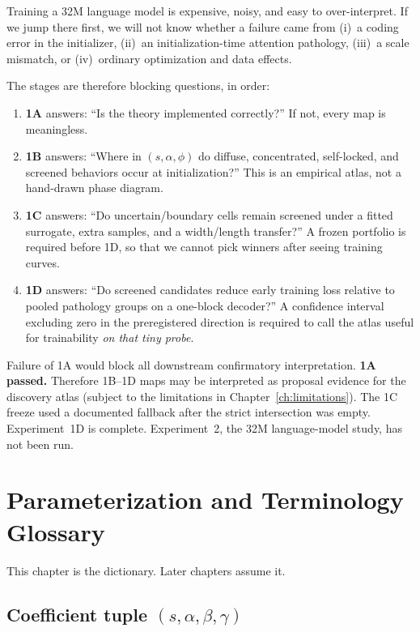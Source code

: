\documentclass[11pt,a4paper]{report}
\begin{document}
Training a 32M language model is expensive, noisy, and easy to over-interpret. If we jump there first, we will not know whether a failure came from (i)~a coding error in the initializer, (ii)~an initialization-time attention pathology, (iii)~a scale mismatch, or (iv)~ordinary optimization and data effects.

The stages are therefore blocking questions, in order:
\begin{enumerate}[leftmargin=*]
  \item \textbf{1A} answers: ``Is the theory implemented correctly?'' If not, every map is meaningless.
  \item \textbf{1B} answers: ``Where in $(s,\alpha,\phi)$ do diffuse, concentrated, self-locked, and screened behaviors occur at initialization?'' This is an empirical atlas, not a hand-drawn phase diagram.
  \item \textbf{1C} answers: ``Do uncertain/boundary cells remain screened under a fitted surrogate, extra samples, and a width/length transfer?'' A frozen portfolio is required before 1D, so that we cannot pick winners after seeing training curves.
  \item \textbf{1D} answers: ``Do screened candidates reduce early training loss relative to pooled pathology groups on a one-block decoder?'' A confidence interval excluding zero in the preregistered direction is required to call the atlas useful for trainability \emph{on that tiny probe}.
\end{enumerate}

Failure of 1A would block all downstream confirmatory interpretation. \textbf{1A passed.} Therefore 1B--1D maps may be interpreted as proposal evidence for the discovery atlas (subject to the limitations in Chapter~\ref{ch:limitations}). The 1C freeze used a documented fallback after the strict intersection was empty. Experiment~1D is complete. Experiment~2, the 32M language-model study, has not been run.

\chapter{Parameterization and Terminology Glossary}

This chapter is the dictionary. Later chapters assume it.

\section{\texorpdfstring{Coefficient tuple $(s,\alpha,\beta,\gamma)$}{Coefficient tuple (s, alpha, beta, gamma)}}
\end{document}
